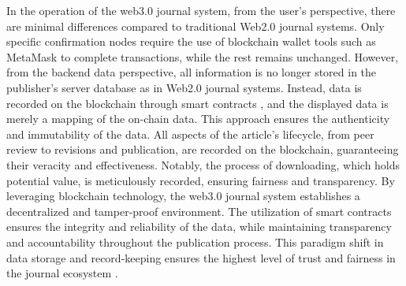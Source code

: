 \documentclass[lettersize,journal]{IEEEtran}
\begin{document}
In the operation of the web3.0 journal system, from the user's perspective, there are minimal differences compared to traditional Web2.0 journal systems. Only specific confirmation nodes require the use of blockchain wallet tools such as MetaMask to complete transactions, while the rest remains unchanged. However, from the backend data perspective, all information is no longer stored in the publisher's server database as in Web2.0 journal systems. Instead, data is recorded on the blockchain through smart contracts \cite{szabo1996smart}, and the displayed data is merely a mapping of the on-chain data.
This approach ensures the authenticity and immutability of the data. All aspects of the article's lifecycle, from peer review to revisions and publication, are recorded on the blockchain, guaranteeing their veracity and effectiveness. Notably, the process of downloading, which holds potential value, is meticulously recorded, ensuring fairness and transparency.
By leveraging blockchain technology, the web3.0 journal system establishes a decentralized and tamper-proof environment. The utilization of smart contracts ensures the integrity and reliability of the data, while maintaining transparency and accountability throughout the publication process. This paradigm shift in data storage and record-keeping ensures the highest level of trust and fairness in the journal ecosystem \cite{wang2022dao}\cite{10394624}\cite{shilina2023decentralized}.
\end{document}
